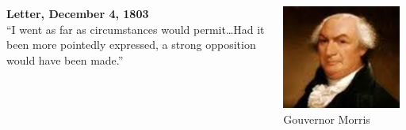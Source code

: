 \begin{frame}
    \begin{columns}[onlytextwidth]
            \textbf{Letter, December 4, 1803} \\
            ``I went as far as circumstances would permit\ldots Had it been
            more pointedly expressed, a strong opposition would have been made.''

            \centering
            \includegraphics[width=0.95\textwidth]{img/morris-portrait.png} \\
            Gouvernor Morris \\
    \end{columns}
\end{frame}

